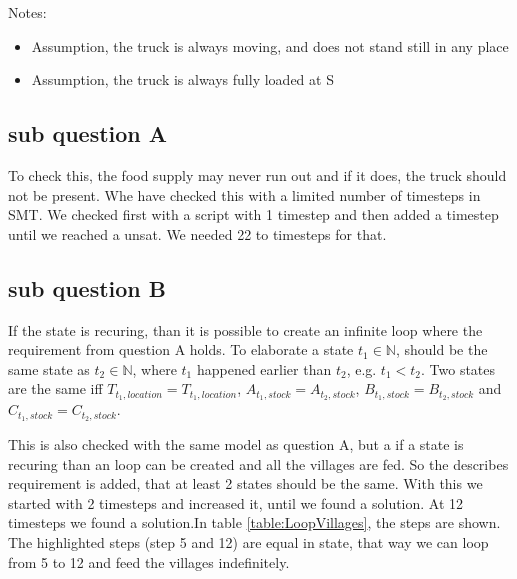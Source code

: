 Notes:
\begin{itemize}
\item Assumption, the truck is always moving, and does not stand still in any place \\
\item Assumption, the truck is always fully loaded at S
\end{itemize}

\subsection{sub question A}
To check this, the food supply may never run out and if it does, the truck should not be present. Whe have checked this with a limited number of timesteps in SMT. We checked first with a script with 1 timestep and then added a timestep until we reached a unsat. We needed 22 to timesteps for that.


\subsection{sub question B}
If the state is recuring, than it is possible to create an infinite loop where the requirement from question A holds. To elaborate a state $t_1 \in \mathbb{N}$, should be the same state as $t_2 \in \mathbb{N}$, where $t_1$ happened earlier than $t_2$, e.g. $t_1 < t_2$. Two states are the same iff $T_{t_1,location} = T_{t_1,location}$, $A_{t_1,stock} = A_{t_2,stock}$, $B_{t_1,stock} = B_{t_2,stock}$ and $C_{t_1,stock} = C_{t_2,stock}$.

This is also checked with the same model as question A, but a if a state is recuring than an loop can be created and all the villages are fed. So the describes requirement is added, that at least 2 states should be the same. With this we started with 2 timesteps and increased it, until we found a solution. At 12 timesteps we found a solution.In table \ref{table:LoopVillages}, the steps are shown. The highlighted steps (step 5 and 12) are equal in state, that way we can loop from 5 to 12 and feed the villages indefinitely.


